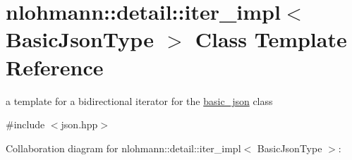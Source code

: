 \hypertarget{classnlohmann_1_1detail_1_1iter__impl}{}\section{nlohmann\+:\+:detail\+:\+:iter\+\_\+impl$<$ Basic\+Json\+Type $>$ Class Template Reference}
\label{classnlohmann_1_1detail_1_1iter__impl}


a template for a bidirectional iterator for the \hyperlink{classnlohmann_1_1basic__json}{basic\+\_\+json} class  




{\ttfamily \#include $<$json.\+hpp$>$}



Collaboration diagram for nlohmann\+:\+:detail\+:\+:iter\+\_\+impl$<$ Basic\+Json\+Type $>$\+:
